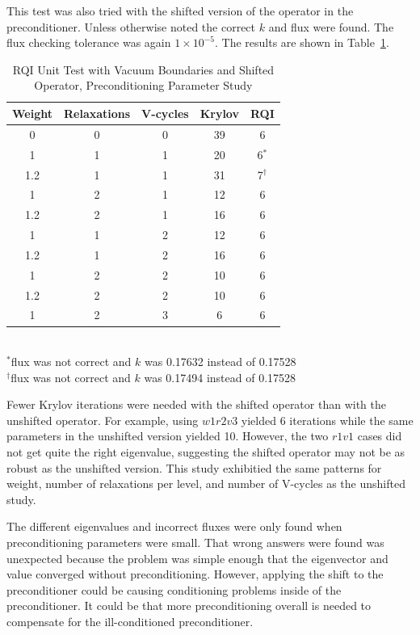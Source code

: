 This test was also tried with the shifted version of the operator in the preconditioner. Unless otherwise noted the correct $k$ and flux were found. The flux checking tolerance was again $1 \times 10^{-5}$. The results are shown in Table~\ref{table:RQIUnitTestVacShifted}.
%
\begin{table}[!h]
\caption{RQI Unit Test with Vacuum Boundaries and Shifted Operator, Preconditioning Parameter Study}
\begin{center}
\begin{tabular}{| c | c | c | c | c |}
\hline
Weight & Relaxations & V-cycles & Krylov & RQI \\[0.5ex]
\hline
0    & 0 & 0 & 39 & 6 \\
1    & 1 & 1 & 20 & 6$^{*}$ \\
1.2 & 1 & 1 & 31 & 7$^{\dag}$ \\
1    & 2 & 1 & 12 & 6 \\
1.2 & 2 & 1 & 16 & 6 \\
1    & 1 & 2 & 12 & 6 \\
1.2 & 1 & 2 & 16 & 6 \\
1    & 2 & 2 & 10 & 6 \\
1.2 & 2 & 2 & 10 & 6 \\
1    & 2 & 3 & 6   & 6 \\
\hline 
\end{tabular}\\
$^{*}$flux was not correct and $k$ was 0.17632 instead of 0.17528 \\
 $^{\dag}$flux was not correct and $k$ was 0.17494 instead of 0.17528
\end{center}
\label{table:RQIUnitTestVacShifted}
\end{table}

Fewer Krylov iterations were needed with the shifted operator than with the unshifted operator. For example, using $w1r2v3$ yielded 6 iterations while the same parameters in the unshifted version yielded 10. However, the two $r1v1$ cases did not get quite the right eigenvalue, suggesting the shifted operator may not be as robust as the unshifted version. This study exhibitied the same patterns for weight, number of relaxations per level, and number of V-cycles as the unshifted study. 

The different eigenvalues and incorrect fluxes were only found when preconditioning parameters were small. That wrong answers were found was unexpected because the problem was simple enough that the eigenvector and value converged without preconditioning. However, applying the shift to the preconditioner could be causing conditioning problems inside of the preconditioner. It could be that more preconditioning overall is needed to compensate for the ill-conditioned preconditioner.  

